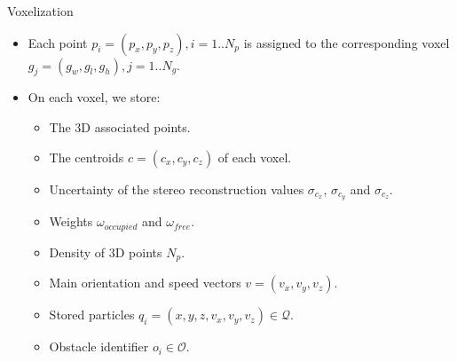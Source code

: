 \begin{frame}[t]{Voxelization}
  \begin{overlayarea}{\textwidth}{\textheight}
  \begin{itemize}
   \item<1-> Each point $p_i = (p_x, p_y, p_z), i=1..N_p$ is assigned to the corresponding voxel $g_j=(g_w, g_l, g_h), j=1..N_g$.
   \item<2-> On each voxel, we store:
   \begin{itemize}
    \item<3-> The 3D associated points.
    \item<4-> The centroids $c=(c_x, c_y, c_z)$ of each voxel.
    \item<5-> Uncertainty of the stereo reconstruction values $\sigma_{c_x}$, $\sigma_{c_y}$ and $\sigma_{c_z}$.
    \item<6-> Weights $\omega_{occupied}$ and $\omega_{free}$.
    \item<7-> Density of 3D points $N_p$.
    \item<8-> Main orientation and speed vectors $v=(v_x, v_y, v_z)$.
    \item<9-> Stored particles $q_i = (x, y, z, v_x, v_y, v_z) \in \mathcal{Q}$.
    \item<10-> Obstacle identifier $o_i \in \mathcal{O}$.
   \end{itemize}


\end{itemize}
\end{overlayarea}
\end{frame}
